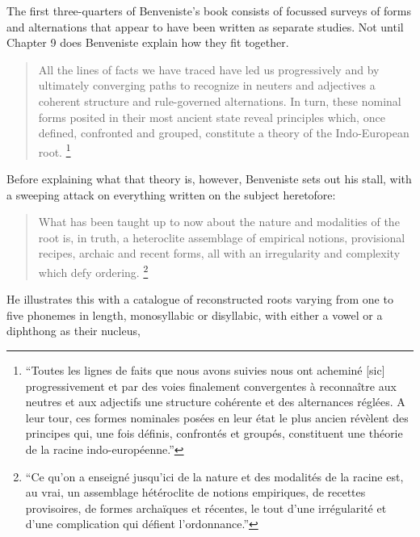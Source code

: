 \documentclass[output=paper]{langscibook}
\begin{document}
The first three-quarters of Benveniste's book consists of focussed surveys of forms and alternations that appear to have been written as separate studies. Not until Chapter 9 does Benveniste explain how they fit together.

\begin{quotation}
All the lines of facts we have traced have led us progressively and by ultimately converging paths to recognize in neuters and adjectives a coherent structure and rule-governed alternations. In turn, these nominal forms posited in their most ancient state reveal principles which, once defined, confronted and grouped, constitute a theory of the Indo-European root. \citep[147]{Benveniste1935}\footnote{``Toutes les lignes de faits que nous avons suivies nous ont acheminé [sic] progressivement et par des voies finalement convergentes à reconnaître aux neutres et aux adjectifs une structure cohérente et des alternances réglées. A leur tour, ces formes nominales posées en leur état le plus ancien révèlent des principes qui, une fois définis, confrontés et groupés, constituent une théorie de la racine indo-européenne.''}
\end{quotation}

Before explaining what that theory is, however, Benveniste sets out his  stall, with a sweeping attack on everything written on the subject heretofore:

\begin{quotation}
What has been taught up to now about the nature and modalities of the root is, in truth, a heteroclite assemblage of empirical notions, provisional recipes, archaic and recent forms, all with an irregularity and complexity which defy ordering. \citep[147]{Benveniste1935}\footnote{``Ce qu'on a enseigné jusqu'ici de la nature et des modalités de la racine est, au vrai, un assemblage hétéroclite de notions empiriques, de recettes provisoires, de formes archaïques et récentes, le tout d’une irrégularité et d’une complication qui défient l’ordonnance.''}
\end{quotation}

He illustrates this with a catalogue of reconstructed roots varying from one to five phonemes in length, monosyllabic or disyllabic, with either a vowel or a diphthong as their nucleus, 
\end{document}
